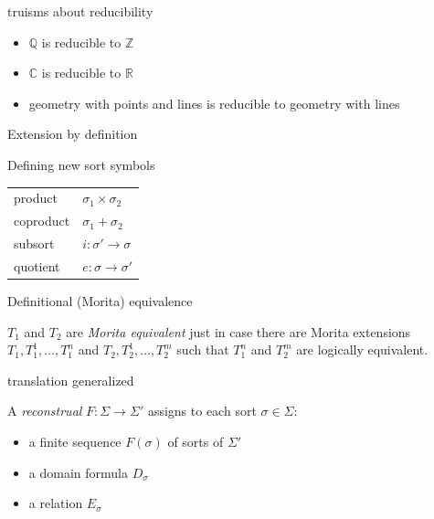 \documentclass[17pt]{beamer}
\begin{document}
\begin{frame}{\small truisms about reducibility}

\begin{itemize}
  \item $\mathbb{Q}$ is reducible to $\mathbb{Z}$
  \item $\mathbb{C}$ is reducible to $\mathbb{R}$
  \item geometry with points and lines is reducible to geometry with
    lines
  \end{itemize}

  

\end{frame}


\begin{frame}{\small Extension by definition}

Defining new sort symbols

\bigskip
\begin{tabular}{l l}
product & $\sigma _1\times \sigma _2$ \\
coproduct & $\sigma _1+\sigma _2$ \\
subsort & $i:\sigma '\to \sigma$ \\
quotient & $e:\sigma\to\sigma '$ \end{tabular}

\end{frame}


\begin{frame}{\small Definitional (Morita) equivalence}

  $T_1$ and $T_2$ are \emph{Morita equivalent} just in case there are
  Morita extensions $T_1,T_1^1,\dots ,T_1^n$ and
  $T_2,T_2^1,\dots ,T_2^m$ such that $T_1^n$ and $T_2^m$ are logically
  equivalent.

  



\end{frame}



\begin{frame}{\small translation generalized}

  A \emph{reconstrual} $F:\Sigma\to\Sigma '$ assigns to each sort $\sigma\in\Sigma$:
  \begin{itemize}
    \item a finite sequence $F(\sigma
      )$ of sorts of $\Sigma '$
    \item a domain formula
      $D_\sigma$
    \item a relation $E_\sigma$ \end{itemize}

  


\end{frame}
\end{document}
